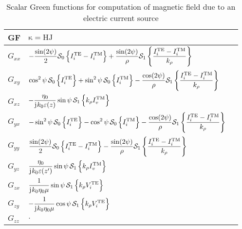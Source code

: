 \documentclass[12pt]{article}
\begin{document}
%
%
%
\begin{table}[!ht]
  \begin{center}
    \begin{tabular}{| C{1cm} | C{12cm} |  @{}m{0pt}@{}}
      \hline
      GF & $\mathrm{\kappa} = \mathrm{HJ}$ &\\ [1.5ex]
      \hline\hline
      $G_{xx}$ & $ \displaystyle - \frac{\sin (2 \psi)}{2} \mathcal{S}_0 \left \{ {I_i^\mathrm{TE} - I_i^\mathrm{TM}} \right \} + \frac{\sin (2 \psi)}{\rho} \mathcal{S}_1 \left \{ \frac{I_i^\mathrm{TE} - I_i^\mathrm{TM}}{k_{\rho}} \right \}$ &\\ [3.5ex]
      $G_{xy}$ & $ \displaystyle  \cos^2 \psi \, \mathcal{S}_0 \left \{ I_i^\mathrm{TE} \right \} + \sin^2 \psi \, \mathcal{S}_0 \left \{ I_i^\mathrm{TM} \right \} - \frac{ \cos (2 \psi)}{\rho} \mathcal{S}_1 \left \{ \frac{I_i^\mathrm{TE} - I_i^\mathrm{TM}}{k_{\rho}} \right \}$ &\\ [3.5ex]
      $G_{xz}$ & $\displaystyle -\frac{\eta_0}{\mathrm{j}\mkern1mu k_0 \varepsilon(z)} \sin \psi \,  \mathcal{S}_1 \left \{ {k_{\rho} I_v^\mathrm{TM}} \right \}$ &\\ [3.5ex]
      $G_{yx}$ & $ \displaystyle  -\sin^2 \psi \, \mathcal{S}_0 \left \{ I_i^\mathrm{TE} \right \} - \cos^2 \psi \, \mathcal{S}_0 \left \{ I_i^\mathrm{TM} \right \} - \frac{ \cos (2 \psi)}{\rho} \mathcal{S}_1 \left \{ \frac{I_i^\mathrm{TE} - I_i^\mathrm{TM}}{k_{\rho}} \right \}$  &\\ [3.5ex]
      $G_{yy}$ & $ \displaystyle  \frac{\sin (2 \psi)}{2} \mathcal{S}_0 \left \{ {I_i^\mathrm{TE} - I_i^\mathrm{TM}} \right \} - \frac{\sin (2 \psi)}{\rho} \mathcal{S}_1 \left \{ \frac{I_i^\mathrm{TE} - I_i^\mathrm{TM}}{k_{\rho}} \right \}$ &\\ [3.5ex]
      $G_{yz}$ & $\displaystyle \frac{\eta_0}{\mathrm{j}\mkern1mu k_0 \varepsilon(z')} \sin \psi \,  \mathcal{S}_1 \left \{ {k_{\rho} I_v^\mathrm{TM}} \right \}$  &\\ [3.5ex]
      $G_{zx}$ & $\displaystyle \frac{1}{\mathrm{j}\mkern1mu k_0 \eta_0 \mu} \sin \psi \,  \mathcal{S}_1 \left \{ {k_{\rho} V_i^\mathrm{TE}} \right \}$    &\\ [3.5ex]
      $G_{zy}$ & $\displaystyle -\frac{1}{\mathrm{j}\mkern1mu k_0 \eta_0 \mu} \cos \psi \,  \mathcal{S}_1 \left \{ {k_{\rho} V_i^\mathrm{TE}} \right \}$   &\\ [3.5ex]
      $G_{zz}$ & $\displaystyle \cdot $  &\\ [3.5ex]
      \hline \hline
    \end{tabular}
  \end{center}
  \caption{Scalar Green functions for computation of magnetic field due to an electric current source \cite{Michalski2005}}
  \label{tab:HJ}
\end{table}
\end{document}
